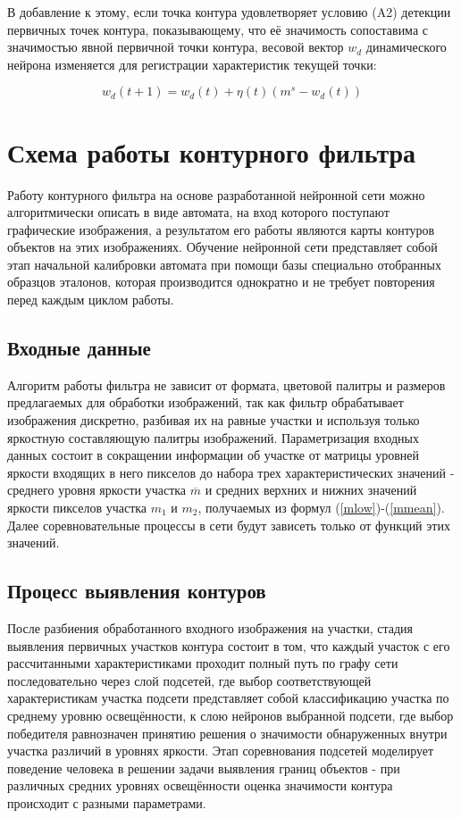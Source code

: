 \documentclass[a4paper,12pt]{report}
\begin{document}
В добавление к этому, если точка контура удовлетворяет условию (A2) детекции первичных точек контура, показывающему, что её значимость сопоставима с значимостью явной первичной точки контура, весовой вектор $w_d$ динамического нейрона изменяется для регистрации характеристик текущей точки:

\begin{equation}
w_d(t+1)=w_d(t)+\eta(t)(m^s-w_d(t))
\end{equation}

\section{Схема работы контурного фильтра}

Работу контурного фильтра на основе разработанной нейронной сети можно алгоритмически описать в виде автомата, на вход которого поступают графические изображения, а результатом его работы являются карты контуров объектов на этих изображениях. Обучение нейронной сети представляет собой этап начальной калибровки автомата при помощи базы специально отобранных образцов эталонов, которая производится однократно и не требует повторения перед каждым циклом работы.

\subsection{Входные данные}

Алгоритм работы фильтра не зависит от формата, цветовой палитры и размеров предлагаемых для обработки изображений, так как фильтр обрабатывает изображения дискретно, разбивая их на равные участки и используя только яркостную составляющую палитры изображений. Параметризация входных данных состоит в сокращении информации об участке от матрицы уровней яркости входящих в него пикселов до набора трех характеристических значений - среднего уровня яркости участка $\overline{m}$ и средних верхних и нижних значений яркости пикселов участка $m_1$ и $m_2$, получаемых из формул (\ref{mlow})-(\ref{mmean}). Далее соревновательные процессы в сети будут зависеть только от функций этих значений.

\subsection{Процесс выявления контуров}

После разбиения обработанного входного изображения на участки, стадия выявления первичных участков контура состоит в том, что каждый участок с его рассчитанными характеристиками проходит полный путь по графу сети последовательно через слой подсетей, где выбор соответствующей характеристикам участка подсети представляет собой классификацию участка по среднему уровню освещённости, к слою нейронов выбранной подсети, где выбор победителя равнозначен принятию решения о значимости обнаруженных внутри участка различий в уровнях яркости. Этап соревнования подсетей моделирует поведение человека в решении задачи выявления границ объектов - при различных средних уровнях освещённости оценка значимости контура происходит с разными параметрами. 
\end{document}
